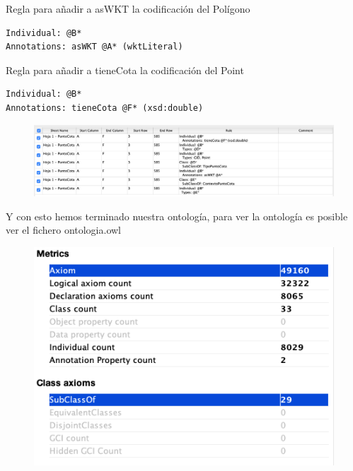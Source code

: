 Regla para añadir a asWKT la codificación del Polígono

\begin{lstlisting}
Individual: @B*
Annotations: asWKT @A* (wktLiteral)
\end{lstlisting}


Regla para añadir a tieneCota la codificación del Point

\begin{lstlisting}
Individual: @B*
Annotations: tieneCota @F* (xsd:double)
\end{lstlisting}

\begin{figure}
	\centering
	\includegraphics[width=0.7\linewidth]{imagenes/capitulo4/reglas-puntocota}
	\caption{}
	\label{fig:reglas-puntocota}
\end{figure}



Y con esto hemos terminado nuestra ontología, para ver la ontología es posible ver el fichero ontologia.owl

\begin{figure}[H]
	\centering
	\includegraphics[width=0.7\linewidth]{imagenes/capitulo4/info-ontologia}
	\caption{}
	\label{fig:info-ontologia}
\end{figure}

